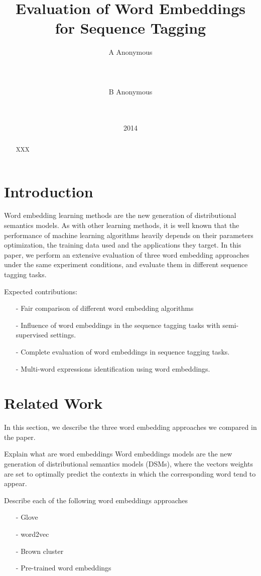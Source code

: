 \documentclass[11pt]{article}
\title{Evaluation of Word Embeddings for Sequence Tagging }
\author{A Anonymous 
   \\%
   \\ %
   \\ %
  \\ %
\And
  B Anonymous
   \\%
   \\%
   \\ %
}
\date{2014}
\begin{document}
\maketitle
\begin{abstract}
XXX
\end{abstract}

\section{Introduction}
Word embedding learning methods are the new generation of distributional semantics models.
As with other learning methods, it is well known that the performance of machine learning algorithms heavily depends on their parameters optimization, the training data used and the applications they target. 
In this paper, we perform an extensive evaluation of three word embedding approaches under the same experiment conditions, and evaluate them in different
sequence tagging tasks. 

Expected contributions:
\begin{itemize}
\item[-] Fair comparison of different word embedding algorithms
\item[-] Influence of word embeddings in the sequence tagging tasks with semi-supervised settings.
\item[-] Complete evaluation of word embeddings in sequence tagging tasks.
\item[-] Multi-word expressions identification using word embeddings.
\end{itemize}


\section{Related Work}
In this section, we describe the three word embedding approaches we compared in the paper.

{\color{blue}Explain what are word embeddings}
Word embeddings models are the new generation of distributional semantics models (DSMs), where the vectors weights are set to optimally predict the contexts in which the corresponding word tend to appear.

{\color{blue}Describe each of the following word embeddings approaches}
\begin{itemize}
\item[-] Glove \cite{pennington2014glove}
\item[-] word2vec \cite{Mikolov13}
\item[-] Brown cluster \cite{Brown92class-basedn-gram}
\item[-] Pre-trained word embeddings \cite{Turian10wordrepresentations}
\end{itemize}
\end{document}
